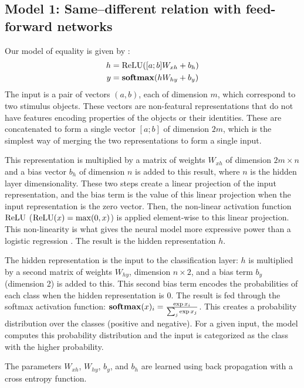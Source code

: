 \subsection{Model 1: Same--different relation with feed-forward  networks}\label{sec:model1}

Our model of equality is given by :
%
\begin{align}
  h &= \operatorname{ReLU}([a;b]W_{xh} + b_{h}) \label{eq:x2h-supp}\\
  y &= \mathbf{softmax}(hW_{hy} + b_{y}) \label{eq:h2y-supp}
\end{align}
%
The input is a pair of vectors $(a,b)$, each of dimension $m$, which correspond to two stimulus objects. These vectors are non-featural representations that do not have features encoding properties of the objects or their identities. These are concatenated to form a single vector $[a;b]$ of dimension $2m$, which is the simplest way of merging the two representations to form a single input.

This representation is multiplied by a matrix of weights $W_{xh}$ of dimension $2m \times n$ and a bias vector $b_{h}$ of dimension $n$ is added to this result, where $n$ is the hidden layer dimensionality. These two steps create a linear projection of the input representation, and the bias term is the value of this linear projection when the input representation is the zero vector. Then, the non-linear activation function $\operatorname{ReLU}$ ($\operatorname{ReLU}(x) = \max(0, x)$) is applied element-wise to this linear projection. This non-linearity is what gives the neural model more expressive power than a logistic regression \citep{Cybenko:1989,Hornik:Stinchcombe:White:1989}. The result is the hidden representation $h$.

The hidden representation is the input to the classification layer: $h$ is multiplied by a second matrix of weights $W_{hy}$, dimension $n \times 2$, and a bias term $b_{y}$ (dimension 2) is added to this. This second bias term encodes the probabilities of each class when the hidden representation is 0. The result is fed through the softmax activation function: $\mathbf{softmax}(x)_{i} = \frac{\exp{x_{i}}}{\sum_{j} \exp{x_{j}}}$. This creates a probability distribution over the classes (positive and negative). For a given input, the model computes this probability distribution and the input is categorized as the class with the higher probability.

The parameters $W_{xh}$, $W_{hy}$, $b_{y}$, and $b_{h}$ are learned using back propagation with a cross entropy function. 

